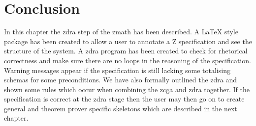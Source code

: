 


\section{Conclusion}
In this chapter the \gls{zdra} step of the \gls{zmath} has been described. A
\LaTeX{} style package has been created to allow a user to annotate a Z
specification and see the structure of the system. A \gls{zdra} program has been
created to check for rhetorical correctness and make sure there are no loops in
the reasoning of the specification. Warning messages appear if the specification
is still lacking some totalising schemas for some preconditions. We have also
formally outlined the \gls{zdra} and shown some rules which occur when combining
the \gls{zcga} and \gls{zdra} together. If the specification is correct at the
\gls{zdra} stage then the user may then go on to create general and theorem
prover specific skeletons which are described in the next chapter.